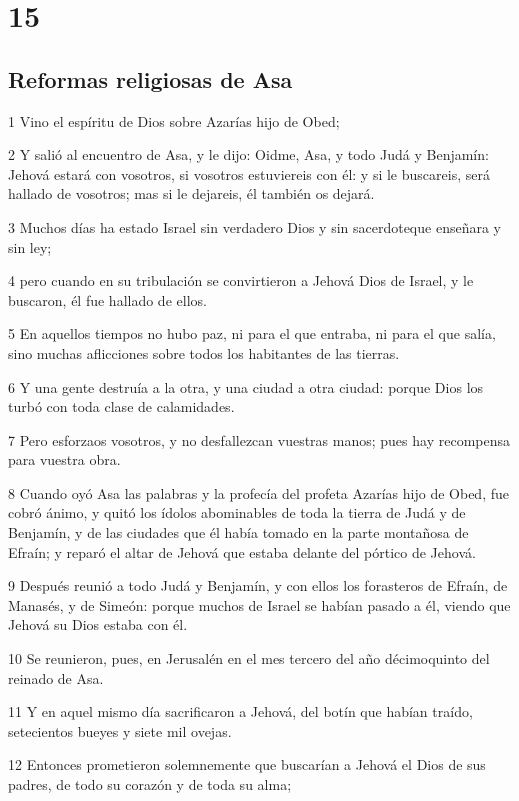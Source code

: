 \chapter{15}

\section*{Reformas religiosas de Asa }

\par 1 Vino el espíritu de Dios sobre Azarías hijo de Obed;
\par 2 Y salió al encuentro de Asa, y le dijo: Oidme, Asa, y todo Judá y Benjamín: Jehová estará con vosotros, si vosotros estuviereis con él: y si le buscareis, será hallado de vosotros; mas si le dejareis, él también os dejará.
\par 3 Muchos días ha estado Israel sin verdadero Dios y sin sacerdoteque enseñara y sin ley;
\par 4 pero cuando en su tribulación se convirtieron a Jehová Dios de Israel, y le buscaron, él fue hallado de ellos.
\par 5 En aquellos tiempos no hubo paz, ni para el que entraba, ni para el que salía, sino muchas aflicciones sobre todos los habitantes de las tierras.
\par 6 Y una gente destruía a la otra, y una ciudad a otra ciudad: porque Dios los turbó con toda clase de calamidades.
\par 7 Pero esforzaos vosotros, y no desfallezcan vuestras manos; pues hay recompensa para vuestra obra.
\par 8 Cuando oyó Asa las palabras y la profecía del profeta Azarías hijo de Obed, fue cobró ánimo, y quitó los ídolos abominables de toda la tierra de Judá y de Benjamín, y de las ciudades que él había tomado en la parte montañosa de Efraín; y reparó el altar de Jehová que estaba delante del pórtico de Jehová.
\par 9 Después reunió a todo Judá y Benjamín, y con ellos los forasteros de Efraín, de Manasés, y de Simeón: porque muchos de Israel se habían pasado a él, viendo que Jehová su Dios estaba con él.
\par 10 Se reunieron, pues, en Jerusalén  en el mes tercero del año décimoquinto del reinado de Asa.
\par 11 Y en aquel mismo día sacrificaron a Jehová, del botín que habían traído, setecientos bueyes y siete mil ovejas.
\par 12 Entonces prometieron solemnemente que buscarían a Jehová el Dios de sus padres, de todo su corazón y de toda su alma;
